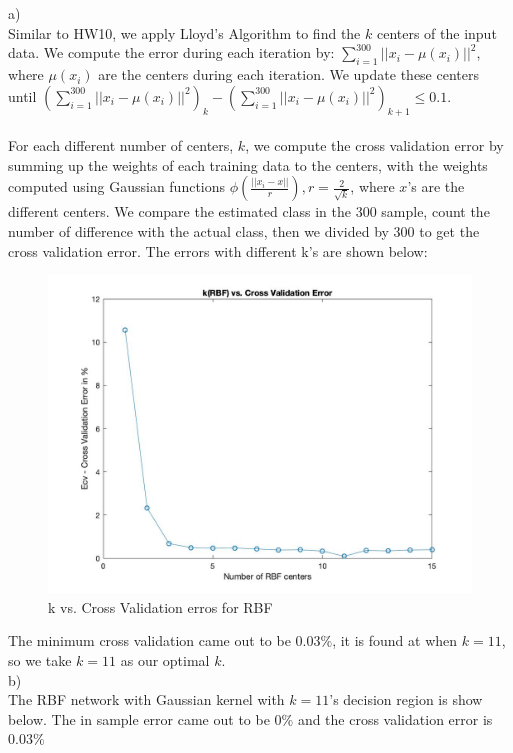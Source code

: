 \documentclass[12pt]{article}
\begin{document}
\newpage
{} \\\\
\noindent a)\\
\indent Similar to HW10, we apply Lloyd's Algorithm to find the $k$ centers of the input data. We compute the error during each iteration by: $\displaystyle \sum_{i = 1}^{300}||x_i-\mu(x_i)||^2$, where $\mu(x_i)$ are the centers during each iteration. We update these centers until $\displaystyle (\sum_{i = 1}^{300}||x_i-\mu(x_i)||^2)_k - (\sum_{i = 1}^{300}||x_i-\mu(x_i)||^2)_{k+1} \leq 0.1$. \\\\
\indent For each different number of centers, $k$, we compute the cross validation error by summing up the weights of each training data to the centers, with the weights computed using Gaussian functions $\displaystyle \phi(\frac{||x_i - x||}{r}), r = \frac{2}{\sqrt{k}}$, where $x$'s are the different centers. We compare the estimated class in the 300 sample, count the number of difference with the actual class, then we divided by 300 to get the cross validation error. The errors with different k's are shown below:
\begin{figure}[H]
  \centering
  \includegraphics[scale = 0.27]{4.jpg}
  \caption{k vs. Cross Validation erros for RBF}
  \label{fig:4}
\end{figure}
\indent The minimum cross validation came out to be $0.03\%$, it is found at when $k = 11$, so we take $k = 11$ as our optimal $k$.\\
\newpage
\noindent b)\\
\indent The RBF network with Gaussian kernel with $k = 11$'s decision region is show below. The in sample error came out to be $0\%$ and the cross validation error is $0.03\%$
\end{document}
